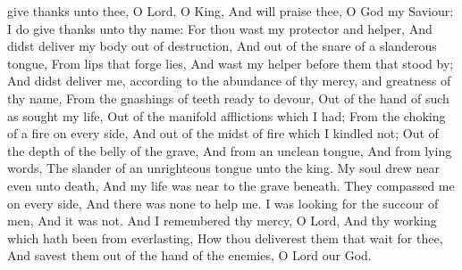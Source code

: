 \label{CommonVirginMartyrIEpistle}
 give thanks unto thee, O Lord, O King, And will praise thee, O God my Saviour: I do give thanks unto thy name: For thou wast my protector and helper, And didst deliver my body out of destruction, And out of the snare of a slanderous tongue, From lips that forge lies, And wast my helper before them that stood by; And didst deliver me, according to the abundance of thy mercy, and greatness of thy name, From the gnashings of teeth ready to devour, Out of the hand of such as sought my life, Out of the manifold afflictions which I had; From the choking of a fire on every side, And out of the midst of fire which I kindled not; Out of the depth of the belly of the grave, And from an unclean tongue, And from lying words, The slander of an unrighteous tongue unto the king. My soul drew near even unto death, And my life was near to the grave beneath. They compassed me on every side, And there was none to help me. I was looking for the succour of men, And it was not. And I remembered thy mercy, O Lord, And thy working which hath been from everlasting, How thou deliverest them that wait for thee, And savest them out of the hand of the enemies, O Lord our God.



